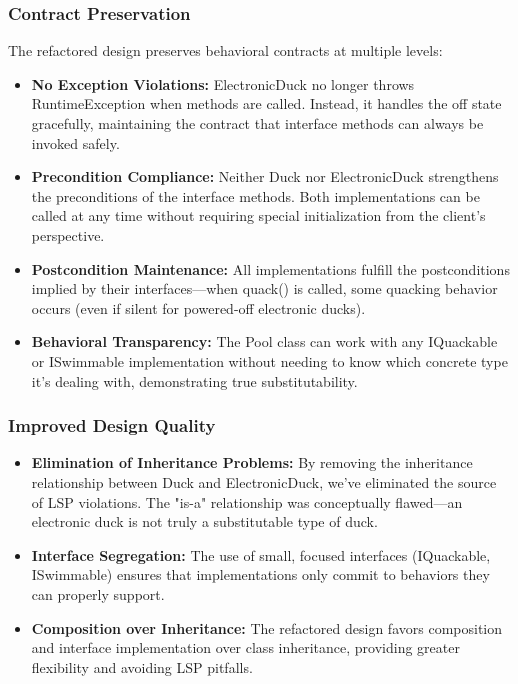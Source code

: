 \subsubsection{Contract Preservation}

The refactored design preserves behavioral contracts at multiple levels:

\begin{itemize}
    \item \textbf{No Exception Violations:} ElectronicDuck no longer throws RuntimeException when methods are called. Instead, it handles the off state gracefully, maintaining the contract that interface methods can always be invoked safely.
    
    \item \textbf{Precondition Compliance:} Neither Duck nor ElectronicDuck strengthens the preconditions of the interface methods. Both implementations can be called at any time without requiring special initialization from the client's perspective.
    
    \item \textbf{Postcondition Maintenance:} All implementations fulfill the postconditions implied by their interfaces—when quack() is called, some quacking behavior occurs (even if silent for powered-off electronic ducks).
    
    \item \textbf{Behavioral Transparency:} The Pool class can work with any IQuackable or ISwimmable implementation without needing to know which concrete type it's dealing with, demonstrating true substitutability.
\end{itemize}

\subsubsection{Improved Design Quality}

\begin{itemize}
    \item \textbf{Elimination of Inheritance Problems:} By removing the inheritance relationship between Duck and ElectronicDuck, we've eliminated the source of LSP violations. The "is-a" relationship was conceptually flawed—an electronic duck is not truly a substitutable type of duck.
    
    \item \textbf{Interface Segregation:} The use of small, focused interfaces (IQuackable, ISwimmable) ensures that implementations only commit to behaviors they can properly support.
    
    \item \textbf{Composition over Inheritance:} The refactored design favors composition and interface implementation over class inheritance, providing greater flexibility and avoiding LSP pitfalls.
\end{itemize}

